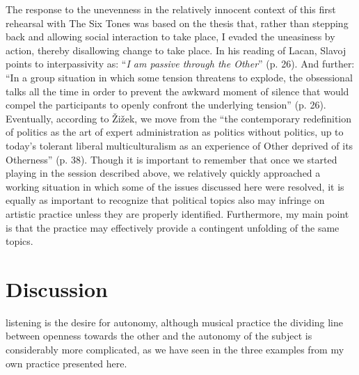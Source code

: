 \documentclass[a4paper]{article}
\begin{document}
The response to the unevenness in the relatively innocent context of this first rehearsal with The Six Tones was based on the thesis that, rather than stepping back and allowing social interaction to take place, I evaded the uneasiness by action, thereby disallowing change to take place. In his reading of Lacan, Slavoj \citet{zizek2011} points to interpassivity as: ``\emph{I am passive through the Other}'' (p. 26). And further: ``In a group situation in which some tension threatens to explode, the obsessional talks all the time in order to prevent the awkward moment of silence that would compel the participants to openly confront the underlying tension'' (p. 26). Eventually, according to \v{Z}i\v{z}ek, we move from the ``the contemporary redefinition of politics as the art of expert administration as politics without politics, up to today's tolerant liberal multiculturalism as an experience of Other deprived of its Otherness'' (p. 38). Though it is important to remember that once we started playing in the session described above, we relatively quickly approached a working situation in which some of the issues discussed here were resolved, it is equally as important to recognize that political topics also may infringe on artistic practice unless they are properly identified. Furthermore, my main point is that the practice may effectively provide a contingent unfolding of the same topics.


\section*{Discussion}
 listening is the desire for autonomy, although musical practice the dividing line between openness towards the other and the autonomy of the subject is considerably more complicated, as we have seen in the three examples from my own practice presented here.
\end{document}
